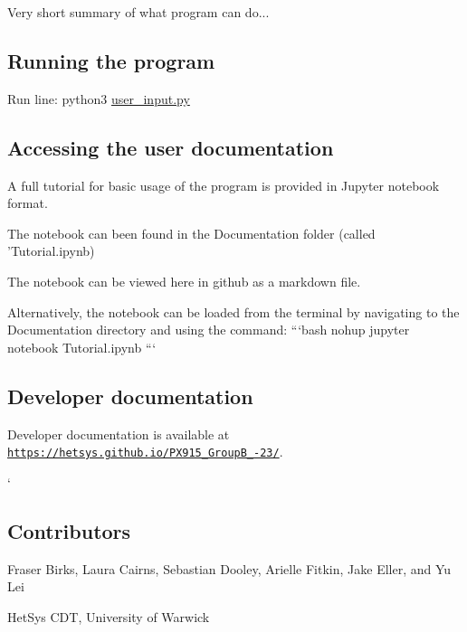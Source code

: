 Very short summary of what program can do...

\subsection*{Running the program}

Run line\-: {\ttfamily python3 \hyperlink{user__input_8py}{user\-\_\-input.\-py}}

\subsection*{Accessing the user documentation}

A full tutorial for basic usage of the program is provided in Jupyter notebook format.
\begin{DoxyItemize}
\item The notebook can been found in the Documentation folder (called 'Tutorial.\-ipynb)
\item The notebook can be viewed here in github as a markdown file.
\item Alternatively, the notebook can be loaded from the terminal by navigating to the Documentation directory and using the command\-: ```bash nohup jupyter notebook Tutorial.\-ipynb ```
\end{DoxyItemize}

\subsection*{Developer documentation}

Developer documentation is available at \href{https://hetsys.github.io/PX915_GroupB_22-23/}{\tt https\-://hetsys.\-github.\-io/\-P\-X915\-\_\-\-Group\-B\-\_-\/23/}.

 ` \subsection*{Contributors}

Fraser Birks, Laura Cairns, Sebastian Dooley, Arielle Fitkin, Jake Eller, and Yu Lei

Het\-Sys C\-D\-T, University of Warwick 